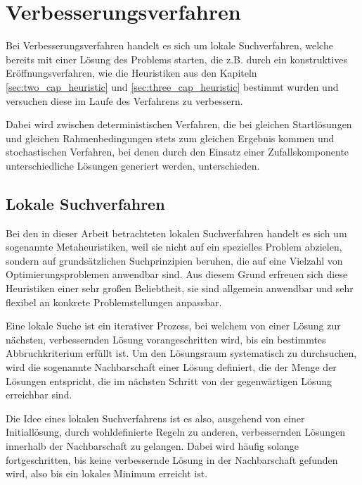 \pagebreak

\section{Verbesserungsverfahren}
\label{sec:post_optimization}

Bei Verbesserungsverfahren handelt es sich um lokale Suchverfahren, welche bereits mit einer Lösung des Problems starten,
die z.B. durch ein konstruktives Eröffnungsverfahren, wie die Heuristiken aus den Kapiteln \ref{sec:two_cap_heuristic} und \ref{sec:three_cap_heuristic} bestimmt wurden und versuchen diese im Laufe des Verfahrens zu verbessern.

Dabei wird zwischen deterministischen Verfahren, die bei gleichen Startlösungen und gleichen Rahmenbedingungen stets zum gleichen
Ergebnis kommen und stochastischen Verfahren, bei denen durch den Einsatz einer Zufallskomponente unterschiedliche Lösungen
generiert werden, unterschieden. \cite{Knust2017}

\subsection{Lokale Suchverfahren}
\label{sec:local_search}

Bei den in dieser Arbeit betrachteten lokalen Suchverfahren handelt es sich um sogenannte Metaheuristiken,
weil sie nicht auf ein spezielles Problem abzielen, sondern auf grundsätzlichen Suchprinzipien beruhen,
die auf eine Vielzahl von Optimierungsproblemen anwendbar sind.
Aus diesem Grund erfreuen sich diese Heuristiken einer sehr großen Beliebtheit,
sie sind allgemein anwendbar und sehr flexibel an konkrete Problemstellungen anpassbar.

Eine lokale Suche ist ein iterativer Prozess, bei welchem von einer Lösung zur nächsten, verbessernden Lösung vorangeschritten wird,
bis ein bestimmtes Abbruchkriterium erfüllt ist. Um den Lösungsraum systematisch zu durchsuchen, wird die
sogenannte Nachbarschaft einer Lösung definiert, die der Menge der Lösungen entspricht, die im nächsten Schritt
von der gegenwärtigen Lösung erreichbar sind. \cite{Brucker2006}

Die Idee eines lokalen Suchverfahrens ist es also, ausgehend von einer Initiallösung, durch wohldefinierte Regeln zu anderen,
verbessernden Lösungen innerhalb der Nachbarschaft zu gelangen.
Dabei wird häufig solange fortgeschritten, bis keine verbessernde Lösung in der Nachbarschaft gefunden wird,
also bis ein lokales Minimum erreicht ist.

